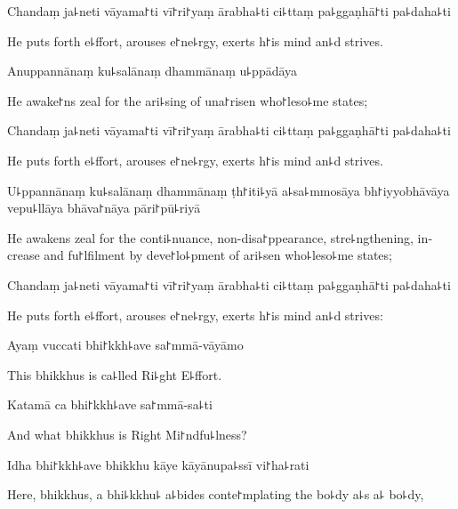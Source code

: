 Chandaṃ ja꜕neti vāyama꜓ti vī꜓ri꜓yaṃ ārabha꜕ti ci꜕ttaṃ pa꜕ggaṇhā꜓ti pa꜕daha꜕ti

\begin{english}
  He puts forth e꜕ffort, arouses e꜓ne꜕rgy, exerts h꜓is mind an꜕d strives.
\end{english}

Anuppannānaṃ ku꜕salānaṃ dhammānaṃ u꜕ppādāya

\begin{english}
  He awake꜓ns zeal for the ari꜕sing of una꜓risen who꜓leso꜕me states;
\end{english}

Chandaṃ ja꜕neti vāyama꜓ti vī꜓ri꜓yaṃ ārabha꜕ti ci꜕ttaṃ pa꜕ggaṇhā꜓ti pa꜕daha꜕ti

\begin{english}
  He puts forth e꜕ffort, arouses e꜓ne꜕rgy, exerts h꜓is mind an꜕d strives.
\end{english}

U꜕ppannānaṃ ku꜕salānaṃ dhammānaṃ ṭh꜓iti꜕yā a꜕sa꜕mmosāya bh꜓iyyobhāvāya vepu꜕llāya bhāva꜓nāya pāri꜓pū꜕riyā

\begin{english}
  He awakens zeal for the conti꜕nuance, non-disa꜓ppearance, stre꜕ngthening, increase and fu꜓lfilment by deve꜓lo꜕pment of ari꜕sen who꜕leso꜕me states;
\end{english}

Chandaṃ ja꜕neti vāyama꜓ti vī꜓ri꜓yaṃ ārabha꜕ti ci꜕ttaṃ pa꜕ggaṇhā꜓ti pa꜕daha꜕ti

\begin{english}
  He puts forth e꜕ffort, arouses e꜓ne꜕rgy, exerts h꜓is mind an꜕d strives:
\end{english}

Ayaṃ vuccati bhi꜓kkh꜕ave sa꜓mmā-vāyāmo

\begin{english}
  This bhikkhus is ca꜕lled Ri꜕ght E꜕ffort.
\end{english}

Katamā ca bhi꜓kkh꜕ave sa꜓mmā-sa꜕ti

\begin{english}
  And what bhikkhus is Right Mi꜓ndfu꜕lness?
\end{english}

Idha bhi꜓kkh꜕ave bhikkhu kāye kāyānupa꜕ssī vi꜓ha꜕rati

\begin{english}
  Here, bhikkhus, a bhi꜕kkhu꜕ a꜕bides conte꜓mplating the bo꜕dy a꜕s a꜕ bo꜕dy,
\end{english}


